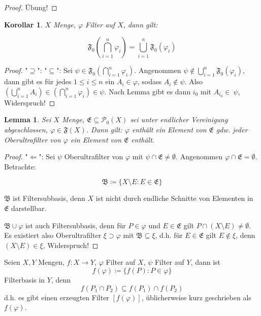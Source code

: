 \documentclass[12pt]{scrartcl}%
\newtheorem{korollar}{Korollar}
\newtheorem{lemma}{Lemma}
\theoremstyle{definition}
\theoremstyle{remark}
\newcommand{\powerset}{\mathcal{P}}
\newcommand{\filterset}{\mathfrak{F}}
\begin{document}
\begin{proof}
    Übung!
\end{proof}

\begin{korollar}
    $X$ Menge, $\varphi$ Filter auf $X$, dann gilt:

    \[ \filterset_0\left(\bigcap_{i=1}^n \varphi_i \right) = \bigcup_{i=1}^n \filterset_0(\varphi_i) \]
\end{korollar}

\begin{proof}
    "$\supseteq$": \checkmark
    "$\subseteq$": Sei $\psi\in\filterset_0\left(\bigcap_{i=1}^n \varphi_i \right)$. Angenommen $\psi\not\in \bigcup_{i=1}^n \filterset_0(\varphi_i)$, dann gibt es für jedes $1\leq i\leq n$ ein $A_i\in\varphi$, sodass $A_i\not\in\psi$. Also $\left( \bigcup_{i=1}^n A_i \right) \in \left( \bigcap_{i=1}^n \varphi_i \right) \in \psi$. Nach Lemma gibt es dann $i_0$ mit $A_{i_0}\in\ \psi$, Widerspruch!
\end{proof}

\begin{lemma}
    Sei $X$ Menge, $\mathfrak{E} \subseteq \powerset_0(X)$ sei unter endlicher Vereinigung abgeschlossen, $\varphi\in\filterset(X)$. Dann gilt: $\varphi$ enthält ein Element von $\mathfrak{E}$ gdw. jeder Oberultrafilter von $\varphi$ ein Element von $\mathfrak{E}$ enthält.
\end{lemma}

\begin{proof}
    "$\Leftarrow$": Sei $\psi$ Oberultrafilter von $\varphi$ mit $\psi \cap \mathfrak{E}\neq \emptyset$. Angenommen $\varphi \cap \mathfrak{E} = \emptyset$. Betrachte:

    \[ \mathfrak{B}\coloneqq \{ X\setminus E: E\in \mathfrak{E} \} \]

    $\mathfrak{B}$ ist Filtersubbasis, denn $X$ ist nicht durch endliche Schnitte von Elementen in $\mathfrak{E}$ darstellbar.

    $\mathfrak{B} \cup \varphi$ ist auch Filtersubbasis, denn für $P\in\varphi$ und $E\in\mathfrak{E}$ gilt $P\cap (X\setminus E) \neq \emptyset$. Es existiert also Oberultrafilter $\xi \supset \varphi$ mit $\mathfrak{B}\subseteq \xi$, d.h. für $E\in\mathfrak{E}$ gilt $E\not\in \xi$, denn $(X\setminus E)\in \xi$, Widerspruch!
\end{proof}

Seien $X,Y$ Mengen, $f:X\to Y$, $\varphi$ Filter auf $X$, $\psi$ Filter auf $Y$, dann ist $$f(\varphi)\coloneqq \{f(P):P\in\varphi\}$$ Filterbasis in $Y$, denn $$f(P_1\cap P_2)\subseteq f(P_1) \cap f(P_2)$$ d.h. es gibt einen erzeugten Filter $[f(\varphi)]$, üblicherweise kurz geschrieben als $f(\varphi)$.
\end{document}
